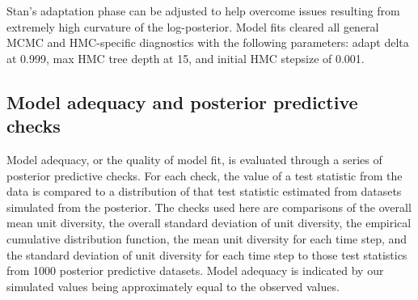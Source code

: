 \documentclass[12pt,letterpaper]{article}
\begin{document}
Stan's adaptation phase can be adjusted to help overcome issues resulting from extremely high curvature of the log-posterior. Model fits cleared all general MCMC and HMC-specific diagnostics with the following parameters: adapt delta at 0.999, max HMC tree depth at 15, and initial HMC stepsize of 0.001. 


\subsection{Model adequacy and posterior predictive checks}

Model adequacy, or the quality of model fit, is evaluated through a series of posterior predictive checks. For each check, the value of a test statistic from the data is compared to a distribution of that test statistic estimated from datasets simulated from the posterior. The checks used here are comparisons of the overall mean unit diversity, the overall standard deviation of unit diversity, the empirical cumulative distribution function, the mean unit diversity for each time step, and the standard deviation of unit diversity for each time step to those test statistics from 1000 posterior predictive datasets. Model adequacy is indicated by our simulated values being approximately equal to the observed values.
\end{document}
